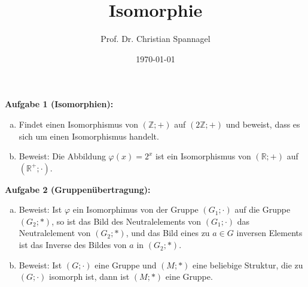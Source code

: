 \documentclass{cssheet}
\title{Isomorphie}
\author{Prof. Dr. Christian Spannagel}
\date{\today}
\begin{document}
	\printtitle

\vspace*{10mm}


\textbf{Aufgabe 1 (Isomorphien):} 

\begin{enumerate}[a)]
\item Findet einen Isomorphismus von $(\mathbb{Z};+)$ auf $(2\mathbb{Z};+)$ und beweist, dass es sich um einen Isomorphismus handelt.
\item Beweist: Die Abbildung $\varphi(x)=2^x$ ist ein Isomorphismus von $(\mathbb{R};+)$ auf $(\mathbb{R}^{+};\cdot)$.
\end{enumerate}

\textbf{Aufgabe 2 (Gruppenübertragung):} 

\begin{enumerate}[a)]
\item Beweist: Ist $\varphi$ ein Isomorphimus von der Gruppe $(G_1;\cdot)$ auf die Gruppe $(G_2;*)$, so ist das Bild des Neutralelements von $(G_1;\cdot)$ das Neutralelement von $(G_2;*)$, und das Bild eines zu $a\in G$ inversen Elements ist das Inverse des Bildes von $a$ in $(G_2;*)$.
\item Beweist: Ist $(G;\cdot)$ eine Gruppe und $(M;*)$ eine beliebige Struktur, die zu $(G;\cdot)$ isomorph ist, dann ist $(M;*)$ eine Gruppe.
\end{enumerate}





\vspace{5cm}
\vspace*{3cm}

\printlicense

\printsocials
\end{document}
